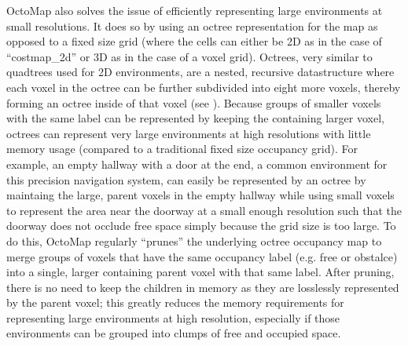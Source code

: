 OctoMap also solves the issue of efficiently representing large environments at small resolutions. It does so by using an octree representation for the map as opposed to a fixed size grid (where the cells can either be 2D as in the case of ``costmap\_2d'' or 3D as in the case of a voxel grid). Octrees, very similar to quadtrees used for 2D environments, are a nested, recursive datastructure where each voxel in the octree can be further subdivided into eight more voxels, thereby forming an octree inside of that voxel (see ). Because groups of smaller voxels with the same label can be represented by keeping the containing larger voxel, octrees can represent very large environments at high resolutions with little memory usage (compared to a traditional fixed size occupancy grid). For example, an empty hallway with a door at the end, a common environment for this precision navigation system, can easily be represented by an octree by maintaing the large, parent voxels in the empty hallway while using small voxels to represent the area near the doorway at a small enough resolution such that the doorway does not occlude free space simply because the grid size is too large. To do this, OctoMap regularly ``prunes'' the underlying octree occupancy map to merge groups of voxels that have the same occupancy label (e.g. free or obstalce) into a single, larger containing parent voxel with that same label. After pruning, there is no need to keep the children in memory as they are losslessly represented by the parent voxel; this greatly reduces the memory requirements for representing large environments at high resolution, especially if those environments can be grouped into clumps of free and occupied space.

\begin{comment}

\begin{enumerate}
\item talk about where the Lfollow feedback was used and how it impacted the performance
\item the math!
\item talk about improved interface thanks to actionlib and why that is important
\item octocostmap/costmap3d

\end{enumerate}

\end{comment}
